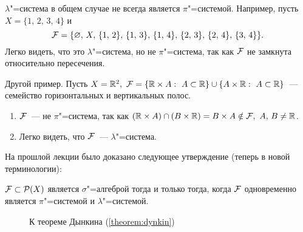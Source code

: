 \begin{exercise}
    $\lambda$"=система в общем случае не всегда является $\pi$"=системой. Например, пусть 
    $X=\{1,\,2,\,3,\,4\}$ и 
    \[
        \mathcal{F}  = \{\varnothing,\, X,\, \{1,\,2\},\, \{1,\,3\},\,\{1,\,4\},\,\{2,\,3\},\,\{2,\,4\},\,\{3,\,4\}\}.    
    \]
    Легко видеть, что это $\lambda$"=система, но не $\pi$"=система, так как $\mathcal{F} $ не замкнута относительно пересечения.
\end{exercise}

\begin{exercise}
    Другой пример. Пусть $X=\mathbb{R}^2,\ \mathcal{F}  = \{\mathbb{R}\times A:\ A\subset \mathbb{R}\}\cup \{A\times \mathbb{R}:\ A\subset \mathbb{R}\}$~---
    семейство горизонтальных и вертикальных полос.
    \begin{enumerate}
        \item $\mathcal{F} $~--- не $\pi$"=система, так как $(\mathbb{R}\times A)\cap (B\times \mathbb{R})=B\times A\notin \mathcal{F} ,\ A,\, B\neq \mathbb{R}$.
        \item Легко видеть, что $\mathcal{F} $~--- $\lambda$"=система.
    \end{enumerate}
\end{exercise}

На прошлой лекции было доказано следующее утверждение (теперь в новой терминологии):
\begin{claim}
    $\mathcal{F} \subset\mathcal{P}(X)$ является $\sigma$"=алгеброй тогда и только тогда, когда $\mathcal{F} $ 
    одновременно является $\pi$"=системой и $\lambda$"=системой.
\end{claim}

\begin{figure}[!ht]
    \centering
    
    \caption{К теореме Дынкина (\ref{theorem:dynkin})}
    \label{fig:sets}
\end{figure}

